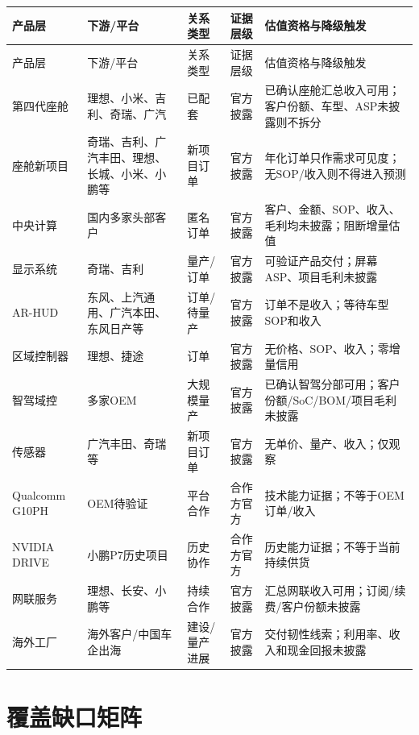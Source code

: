 \begin{longtable}{L{2.1cm}L{2.6cm}L{2.6cm}L{2.1cm}L{4.0cm}}
\toprule
产品层 & 下游/平台 & 关系类型 & 证据层级 & 估值资格与降级触发 \\
\midrule
\endfirsthead
\toprule
产品层 & 下游/平台 & 关系类型 & 证据层级 & 估值资格与降级触发 \\
\midrule
\endhead
第四代座舱 & 理想、小米、吉利、奇瑞、广汽 & 已配套 & 官方披露 & 已确认座舱汇总收入可用；客户份额、车型、ASP未披露则不拆分 \\
座舱新项目 & 奇瑞、吉利、广汽丰田、理想、长城、小米、小鹏等 & 新项目订单 & 官方披露 & 年化订单只作需求可见度；无SOP/收入则不得进入预测 \\
中央计算 & 国内多家头部客户 & 匿名订单 & 官方披露 & 客户、金额、SOP、收入、毛利均未披露；阻断增量估值 \\
显示系统 & 奇瑞、吉利 & 量产/订单 & 官方披露 & 可验证产品交付；屏幕ASP、项目毛利未披露 \\
AR-HUD & 东风、上汽通用、广汽本田、东风日产等 & 订单/待量产 & 官方披露 & 订单不是收入；等待车型SOP和收入 \\
区域控制器 & 理想、捷途 & 订单 & 官方披露 & 无价格、SOP、收入；零增量信用 \\
智驾域控 & 多家OEM & 大规模量产 & 官方披露 & 已确认智驾分部可用；客户份额/SoC/BOM/项目毛利未披露 \\
传感器 & 广汽丰田、奇瑞等 & 新项目订单 & 官方披露 & 无单价、量产、收入；仅观察 \\
Qualcomm G10PH & OEM待验证 & 平台合作 & 合作方官方 & 技术能力证据；不等于OEM订单/收入 \\
NVIDIA DRIVE & 小鹏P7历史项目 & 历史协作 & 合作方官方 & 历史能力证据；不等于当前持续供货 \\
网联服务 & 理想、长安、小鹏等 & 持续合作 & 官方披露 & 汇总网联收入可用；订阅/续费/客户份额未披露 \\
海外工厂 & 海外客户/中国车企出海 & 建设/量产进展 & 官方披露 & 交付韧性线索；利用率、收入和现金回报未披露 \\
\bottomrule
\end{longtable}

\section{覆盖缺口矩阵}

